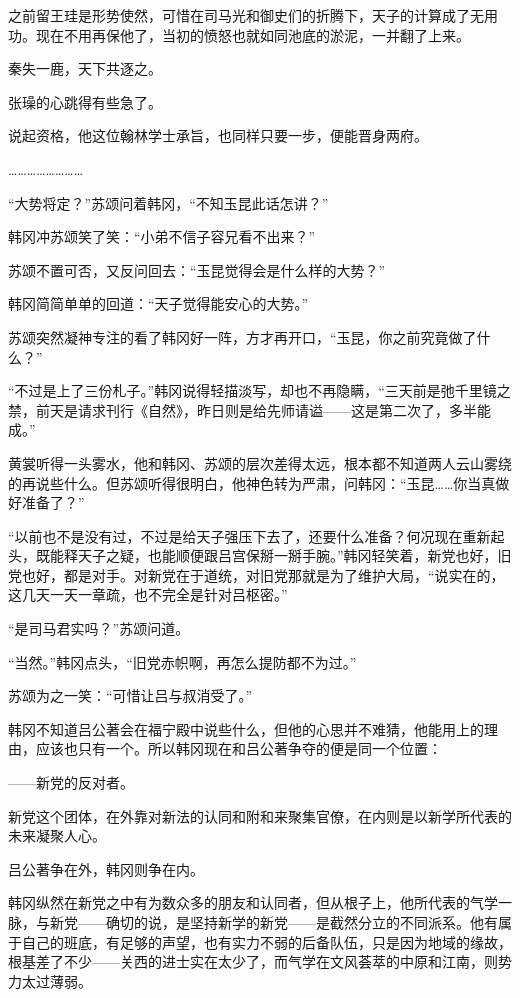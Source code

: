 之前留王珪是形势使然，可惜在司马光和御史们的折腾下，天子的计算成了无用功。现在不用再保他了，当初的愤怒也就如同池底的淤泥，一并翻了上来。

秦失一鹿，天下共逐之。

张璪的心跳得有些急了。

说起资格，他这位翰林学士承旨，也同样只要一步，便能晋身两府。

……………………

“大势将定？”苏颂问着韩冈，“不知玉昆此话怎讲？”

韩冈冲苏颂笑了笑：“小弟不信子容兄看不出来？”

苏颂不置可否，又反问回去：“玉昆觉得会是什么样的大势？”

韩冈简简单单的回道：“天子觉得能安心的大势。”

苏颂突然凝神专注的看了韩冈好一阵，方才再开口，“玉昆，你之前究竟做了什么？”

“不过是上了三份札子。”韩冈说得轻描淡写，却也不再隐瞒，“三天前是弛千里镜之禁，前天是请求刊行《自然》，昨日则是给先师请谥——这是第二次了，多半能成。”

黄裳听得一头雾水，他和韩冈、苏颂的层次差得太远，根本都不知道两人云山雾绕的再说些什么。但苏颂听得很明白，他神色转为严肃，问韩冈：“玉昆……你当真做好准备了？”

“以前也不是没有过，不过是给天子强压下去了，还要什么准备？何况现在重新起头，既能释天子之疑，也能顺便跟吕宫保掰一掰手腕。”韩冈轻笑着，新党也好，旧党也好，都是对手。对新党在于道统，对旧党那就是为了维护大局，“说实在的，这几天一天一章疏，也不完全是针对吕枢密。”

“是司马君实吗？”苏颂问道。

“当然。”韩冈点头，“旧党赤帜啊，再怎么提防都不为过。”

苏颂为之一笑：“可惜让吕与叔消受了。”

韩冈不知道吕公著会在福宁殿中说些什么，但他的心思并不难猜，他能用上的理由，应该也只有一个。所以韩冈现在和吕公著争夺的便是同一个位置：

——新党的反对者。

新党这个团体，在外靠对新法的认同和附和来聚集官僚，在内则是以新学所代表的未来凝聚人心。

吕公著争在外，韩冈则争在内。

韩冈纵然在新党之中有为数众多的朋友和认同者，但从根子上，他所代表的气学一脉，与新党——确切的说，是坚持新学的新党——是截然分立的不同派系。他有属于自己的班底，有足够的声望，也有实力不弱的后备队伍，只是因为地域的缘故，根基差了不少——关西的进士实在太少了，而气学在文风荟萃的中原和江南，则势力太过薄弱。

